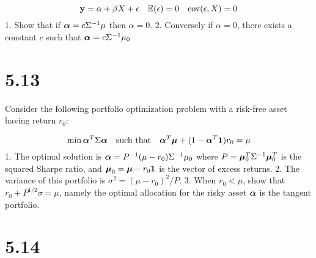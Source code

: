\documentclass[11pt,]{article}
\begin{document}
\[
{\bm{\mathbf{\MakeLowercase{Y}}}} = \alpha + \beta X + \epsilon \quad \mathbb{E}(\epsilon) = 0 \quad \text{cov}(\epsilon, X) = 0
\] 1. Show that if
\({\bm{\mathbf{\MakeLowercase{\alpha}}}} = c\Sigma^{-1}\mu\) then
\(\alpha =0\). 2. Conversely if \(\alpha = 0\), there exists a constant
\(c\) such that
\({\bm{\mathbf{\MakeLowercase{\alpha}}}} = c\Sigma^{-1}\mu_0\)

\hypertarget{section-3}{%
\section{5.13}\label{section-3}}

Consider the following portfolio optimization problem with a risk-free
asset having return \(r_0\):

\[
\min{{\bm{\mathbf{\MakeLowercase{\alpha}}}}^T \Sigma {\bm{\mathbf{\MakeLowercase{\alpha}}}}} \quad \text{such that} \quad {\bm{\mathbf{\MakeLowercase{\alpha}}}}^T {\bm{\mathbf{\MakeLowercase{\mu}}}} + (1-{\bm{\mathbf{\MakeLowercase{\alpha}}}}^T{\bm{\mathbf{\MakeLowercase{1}}}}) r_0 = \mu
\] 1. The optimal solution is
\({\bm{\mathbf{\MakeLowercase{\alpha}}}} = P^{-1} (\mu-r_0)\Sigma^{-1}\mu_0\)
where
\(P = {\bm{\mathbf{\MakeLowercase{\mu}}}}_0^T \Sigma^{-1} {\bm{\mathbf{\MakeLowercase{\mu}}}}_0^T\)
is the squared Sharpe ratio, and
\({\bm{\mathbf{\MakeLowercase{\mu}}}}_0 = {\bm{\mathbf{\MakeLowercase{\mu}}}}-r_0{\bm{\mathbf{\MakeLowercase{1}}}}\)
is the vector of excess returns. 2. The variance of this portfolio is
\(\sigma^2 = (\mu - r_0)^2 / P\). 3. When \(r_0 < \mu\), show that
\(r_0 + P^{1/2} \sigma = \mu\), namely the optimal allocation for the
risky asset \({\bm{\mathbf{\MakeLowercase{\alpha}}}}\) is the tangent
portfolio.

\hypertarget{section-4}{%
\section{5.14}\label{section-4}}
\newpage
\singlespacing 
\end{document}
